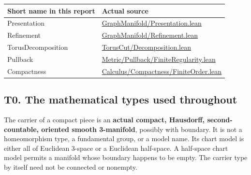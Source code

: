\documentclass[
  letterpaper,
  11pt]{article}
\begin{document}
\begin{longtable}[]{@{}
  >{\raggedright\arraybackslash}p{}
  >{\raggedright\arraybackslash}p{}@{}}
\toprule\noalign{}
\begin{minipage}[b]{\linewidth}\raggedright
Short name in this report
\end{minipage} & \begin{minipage}[b]{\linewidth}\raggedright
Actual source
\end{minipage} \\
\midrule\noalign{}
\endhead
\bottomrule\noalign{}
\endlastfoot
Presentation &
\href{https://github.com/qinz1yang/differential-geometry-dev/blob/ea0fae60ee01ef8c8d9b57a51794c6538f679c5d/DifferentialGeometry/Topology/ThreeManifold/GraphManifold/Presentation.lean}{GraphManifold/Presentation.lean} \\
Refinement &
\href{https://github.com/qinz1yang/differential-geometry-dev/blob/ea0fae60ee01ef8c8d9b57a51794c6538f679c5d/DifferentialGeometry/Topology/ThreeManifold/GraphManifold/Refinement.lean}{GraphManifold/Refinement.lean} \\
TorusDecomposition &
\href{https://github.com/qinz1yang/differential-geometry-dev/blob/ea0fae60ee01ef8c8d9b57a51794c6538f679c5d/DifferentialGeometry/Topology/ThreeManifold/TorusCut/Decomposition.lean}{TorusCut/Decomposition.lean} \\
Pullback &
\href{https://github.com/qinz1yang/differential-geometry-dev/blob/ea0fae60ee01ef8c8d9b57a51794c6538f679c5d/DifferentialGeometry/Geometry/Metric/Pullback/FiniteRegularity.lean}{Metric/Pullback/FiniteRegularity.lean} \\
Compactness &
\href{https://github.com/qinz1yang/differential-geometry-dev/blob/ea0fae60ee01ef8c8d9b57a51794c6538f679c5d/DifferentialGeometry/Analysis/Calculus/Compactness/FiniteOrder.lean}{Calculus/Compactness/FiniteOrder.lean} \\
\end{longtable}

\subsection{T0. The mathematical types used throughout}\label{t0}

The carrier of a compact piece is an \textbf{actual compact, Hausdorff,
second-countable, oriented smooth 3-manifold}, possibly with boundary.
It is not a homeomorphism type, a fundamental group, or a model name.
Its chart model is either all of Euclidean 3-space or a Euclidean
half-space. A half-space chart model permits a manifold whose boundary
happens to be empty. The carrier type by itself need not be connected or
nonempty.
\end{document}
